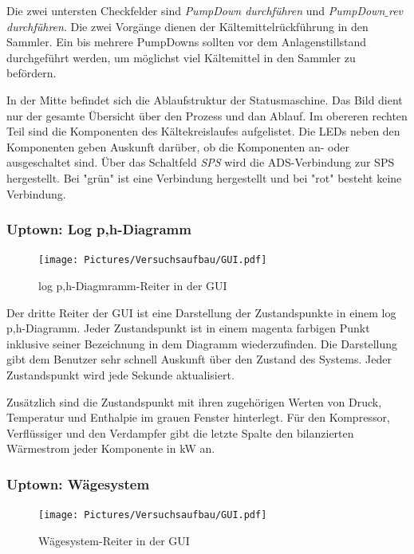 Die zwei untersten Checkfelder sind \textit{PumpDown durchführen} und \textit{PumpDown$\_$rev durchführen}. Die zwei Vorgänge dienen der Kältemittelrückführung in den Sammler. Ein bis mehrere PumpDowns sollten vor dem Anlagenstillstand durchgeführt werden, um möglichst viel Kältemittel in den Sammler zu befördern. 

In der Mitte befindet sich die Ablaufstruktur der Statusmaschine. Das Bild dient nur der gesamte Übersicht über den Prozess und dan Ablauf. Im obereren rechten Teil sind die Komponenten des Kältekreislaufes aufgelistet. Die LEDs neben den Komponenten geben Auskunft darüber, ob die Komponenten an- oder ausgeschaltet sind.   Über das Schaltfeld \textit{SPS} wird die ADS-Verbindung zur SPS hergestellt. Bei "grün" ist eine Verbindung hergestellt und bei "rot" besteht keine Verbindung. 



\subsubsection*{Uptown: Log p,h-Diagramm}

\begin{figure}[htb]
\centering		\texttt{[image: Pictures/Versuchsaufbau/GUI.pdf]}
\caption{log p,h-Diagmramm-Reiter in der GUI}
\label{fig:RI}
\end{figure}

Der dritte Reiter der GUI ist eine Darstellung der Zustandspunkte in einem log p,h-Diagramm. Jeder Zustandspunkt ist in einem magenta farbigen Punkt inklusive seiner Bezeichnung in dem Diagramm wiederzufinden. Die Darstellung gibt dem Benutzer sehr schnell Auskunft über den Zustand des Systems. Jeder Zustandspunkt wird jede Sekunde aktualisiert. 

Zusätzlich sind die Zustandspunkt mit ihren zugehörigen Werten von Druck, Temperatur und Enthalpie im grauen Fenster hinterlegt. Für den Kompressor, Verflüssiger und den Verdampfer gibt die letzte Spalte den bilanzierten Wärmestrom jeder Komponente in kW an. 

\subsubsection*{Uptown: Wägesystem}

\begin{figure}[htb]
\centering		\texttt{[image: Pictures/Versuchsaufbau/GUI.pdf]}
\caption{Wägesystem-Reiter in der GUI}
\label{fig:RI}
\end{figure}

